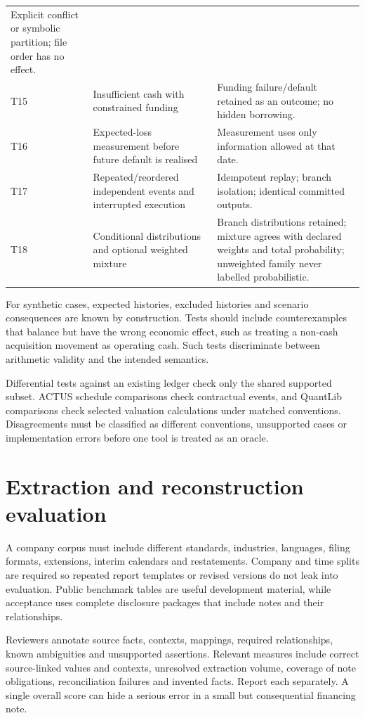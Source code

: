 \begin{longtable}{L{16mm}L{73mm}L{47mm}}
Explicit conflict or symbolic partition; file order has no effect.\\
T15 & Insufficient cash with constrained funding &
Funding failure/default retained as an outcome; no hidden borrowing.\\
T16 & Expected-loss measurement before future default is realised &
Measurement uses only information allowed at that date.\\
T17 & Repeated/reordered independent events and interrupted execution &
Idempotent replay; branch isolation; identical committed outputs.\\
T18 & Conditional distributions and optional weighted mixture &
Branch distributions retained; mixture agrees with declared weights and total
probability; unweighted family never labelled probabilistic.\\
\bottomrule
\end{longtable}

For synthetic cases, expected histories, excluded histories and scenario
consequences are known by construction. Tests should include counterexamples
that balance but have the wrong economic effect, such as treating a
non-cash acquisition movement as operating cash. Such tests discriminate
between arithmetic validity and the intended semantics.

Differential tests against an existing ledger check only the shared supported
subset. ACTUS schedule comparisons check contractual events, and QuantLib
comparisons check selected valuation calculations under matched conventions.
Disagreements must be classified as different conventions, unsupported cases
or implementation errors before one tool is treated as an oracle.

\section{Extraction and reconstruction evaluation}

A company corpus must include different standards, industries, languages,
filing formats, extensions, interim calendars and restatements. Company and
time splits are required so repeated report templates or revised versions do
not leak into evaluation. Public benchmark tables are useful development
material, while acceptance uses complete disclosure packages that include
notes and their relationships.

Reviewers annotate source facts, contexts, mappings, required relationships,
known ambiguities and unsupported assertions. Relevant measures include
correct source-linked values and contexts, unresolved extraction volume,
coverage of note obligations, reconciliation failures and invented facts.
Report each separately. A single overall score can hide a serious error in a
small but consequential financing note.


